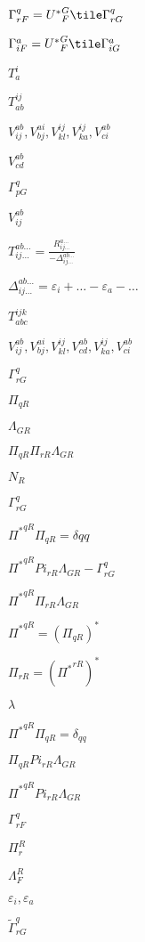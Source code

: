 \documentclass{article}
\begin{document}
$\Gamma^q_{rF} = {U^\ast}^G_F \tile\Gamma^q_{rG}$
\pagebreak

$\Gamma^a_{iF} = {U^\ast}^G_F \tile\Gamma^a_{iG}$
\pagebreak

$T_{a}^{i}$
\pagebreak

$T_{ab}^{ij}$
\pagebreak

$V_{ij}^{ab}, V_{bj}^{ai},
V_{kl}^{ij}, V_{ka}^{ij}, V_{ci}^{ab}$
\pagebreak

$V_{cd}^{ab}$
\pagebreak

$\Gamma_{pG}^q$
\pagebreak

$V_{ij}^{ab}$
\pagebreak

$T_{ij\ldots}^{ab\ldots} = \frac{R_{ij\ldots}^{a\ldots}}
{-\Delta_{ij\ldots}^{ab\ldots}}$
\pagebreak

$\Delta_{ij\ldots}^{ab\ldots} =
\varepsilon_i+\ldots-\varepsilon_a-\ldots$
\pagebreak

$T_{abc}^{ijk}$
\pagebreak

$V_{ij}^{ab}, V_{bj}^{ai},
V_{kl}^{ij}, V_{cd}^{ab}, V_{ka}^{ij}, V_{ci}^{ab}$
\pagebreak

$\Gamma_{rG}^q$
\pagebreak

$\Pi_{qR}$
\pagebreak

$\Lambda_{GR}$
\pagebreak

$\Pi_{qR}\Pi_{rR}\Lambda_{GR}$
\pagebreak

$N_R$
\pagebreak

$\Gamma^q_{rG}$
\pagebreak

${\Pi^\ast}^{qR}\Pi_{qR} = \delta{qq}$
\pagebreak

${\Pi^\ast}^{qR}Pi_{rR}\Lambda_{GR} - \Gamma^q_{rG}$
\pagebreak

${\Pi^\ast}^{qR}\Pi_{rR}\Lambda_{GR}$
\pagebreak

${\Pi^\ast}^{qR} = (\Pi_{qR})^\ast$
\pagebreak

$\Pi_{rR} = ({\Pi^\ast}^{rR})^\ast$
\pagebreak

$\lambda$
\pagebreak

${\Pi^\ast}^{qR}\Pi_{qR} = \delta_{qq}$
\pagebreak

$\Pi_{qR}Pi_{rR}\Lambda_{GR}$
\pagebreak

${\Pi^\ast}^{qR}Pi_{rR}\Lambda_{GR}$
\pagebreak

$\Gamma^q_{rF}$
\pagebreak

$\Pi^R_r$
\pagebreak

$\Lambda^R_F$
\pagebreak

$\varepsilon_i, \varepsilon_a$
\pagebreak

$\tilde\Gamma^q_{rG}$
\pagebreak
\end{document}

